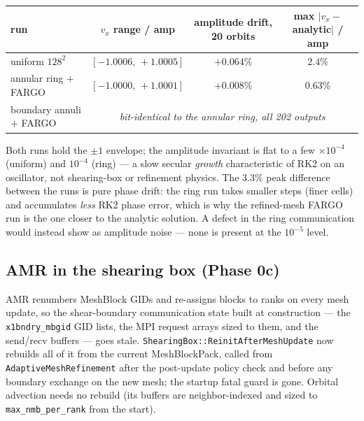 \documentclass[11pt]{article}
\newcommand{\code}[1]{\texttt{#1}}
\begin{document}
\begin{center}
\small
\begin{tabular}{@{}lccc@{}}
\toprule
run & $v_x$ range / amp & amplitude drift, 20 orbits & max $|v_x - $analytic$|$ / amp \\
\midrule
uniform $128^2$        & $[-1.0006,\,+1.0005]$ & $+0.064\%$ & $2.4\%$ \\
annular ring $+$ FARGO & $[-1.0000,\,+1.0001]$ & $+0.008\%$ & $0.63\%$ \\
boundary annuli $+$ FARGO & \multicolumn{3}{c}{\emph{bit-identical to the annular ring,
  all 202 outputs}} \\
\bottomrule
\end{tabular}
\end{center}

Both runs hold the $\pm1$ envelope; the amplitude invariant is flat to a few
$\times10^{-4}$ (uniform) and $10^{-4}$ (ring) --- a slow secular \emph{growth}
characteristic of RK2 on an oscillator, not shearing-box or refinement physics. The
$3.3\%$ peak difference between the runs is pure phase drift: the ring run takes
smaller steps (finer cells) and accumulates \emph{less} RK2 phase error, which is why
the refined-mesh FARGO run is the one closer to the analytic solution. A defect in
the ring communication would instead show as amplitude noise --- none is present at
the $10^{-5}$ level.

\subsection{AMR in the shearing box (Phase 0c)}
\label{sec:t_amr}

AMR renumbers MeshBlock GIDs and re-assigns blocks to ranks on every mesh update,
so the shear-boundary communication state built at construction --- the
\code{x1bndry\_mbgid} GID lists, the MPI request arrays sized to them, and the
send/recv buffers --- goes stale. \code{ShearingBox::ReinitAfterMeshUpdate} now
rebuilds all of it from the current MeshBlockPack, called from
\code{AdaptiveMeshRefinement} after the post-update policy check and before any
boundary exchange on the new mesh; the startup fatal guard is gone. Orbital
advection needs no rebuild (its buffers are neighbor-indexed and sized to
\code{max\_nmb\_per\_rank} from the start).
\end{document}
